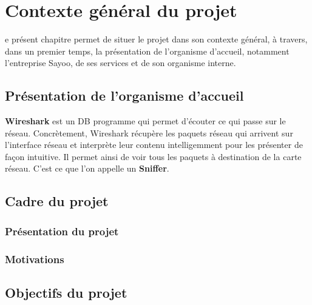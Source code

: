 \chapter{Contexte général du projet}
\begin{onehalfspace}

 e présent chapitre permet de situer le projet dans son contexte général, à travers, dans un premier temps, la présentation de l'organisme d'accueil, notamment l'entreprise Sayoo, de ses services et de son organisme interne.


\section{Présentation de l'organisme d'accueil}

\textbf{Wireshark} est un DB programme qui permet d'écouter ce qui passe sur le réseau. Concrètement, Wireshark récupère les paquets réseau qui arrivent sur l'interface réseau et interprète leur contenu intelligemment pour les présenter de façon intuitive. Il permet ainsi de voir tous les paquets à destination de la carte réseau. C'est ce que l'on appelle un \textbf{Sniffer}.


\section{Cadre du projet}


\subsection{Présentation du projet}

\subsection{Motivations}

\section{Objectifs du projet}


\end{onehalfspace}
